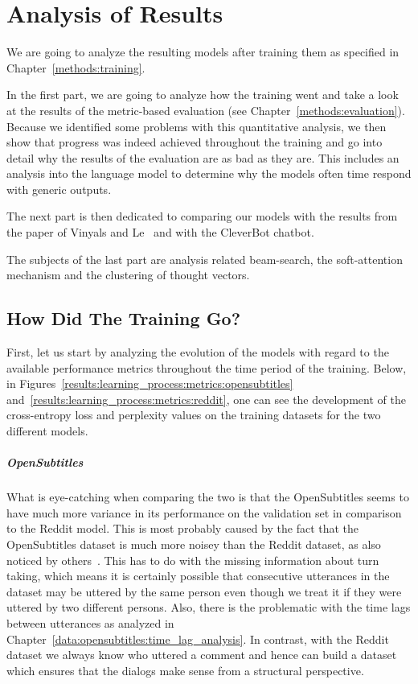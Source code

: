 \chapter{Analysis of Results}
We are going to analyze the resulting models after training them as specified in Chapter~\ref{methods:training}.

In the first part, we are going to analyze how the training went and take a look at the results of the metric-based evaluation (see Chapter~\ref{methods:evaluation}). Because we identified some problems with this quantitative analysis, we then show that progress was indeed achieved throughout the training and go into detail why the results of the evaluation are as bad as they are. This includes an analysis into the language model to determine why the models often time respond with generic outputs.

The next part is then dedicated to comparing our models with the results from the paper of Vinyals and Le~\cite{Vinyals:2015} and with the CleverBot chatbot.

The subjects of the last part are analysis related beam-search, the soft-attention mechanism and the clustering of thought vectors.

\section{How Did The Training Go?}
First, let us start by analyzing the evolution of the models with regard to the available performance metrics throughout the time period of the training. Below, in Figures~\ref{results:learning_process:metrics:opensubtitles} and~\ref{results:learning_process:metrics:reddit}, one can see the development of the cross-entropy loss and perplexity values on the training datasets for the two different models.

\paragraph{OpenSubtitles} What is eye-catching when comparing the two is that the OpenSubtitles seems to have much more variance in its performance on the validation set in comparison to the Reddit model. This is most probably caused by the fact that the OpenSubtitles dataset is much more noisey than the Reddit dataset, as also noticed by others~\cite{Vinyals:2015}. This has to do with the missing information about turn taking, which means it is certainly possible that consecutive utterances in the dataset may be uttered by the same person even though we treat it if they were uttered by two different persons. Also, there is the problematic with the time lags between utterances as analyzed in Chapter~\ref{data:opensubtitles:time_lag_analysis}. In contrast, with the Reddit dataset we always know who uttered a comment and hence can build a dataset which ensures that the dialogs make sense from a structural perspective.

